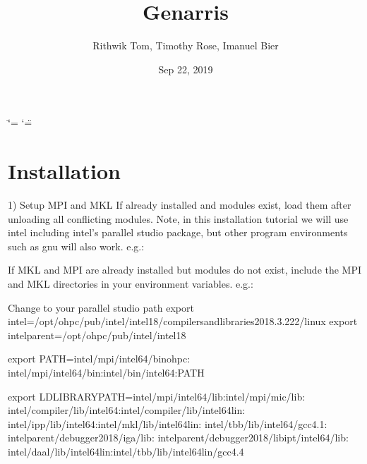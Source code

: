 \documentclass[letterpaper,10pt,english]{sphinxmanual}
\title{Genarris}
\date{Sep 22, 2019}
\author{Rithwik Tom, Timothy Rose, Imanuel Bier}
\begin{document}
\ifdefined\shorthandoff
  \ifnum\catcode`\=\string=\active\shorthandoff{=}\fi
  \ifnum\catcode`\"=\active{}\fi
\fi

\pagestyle{empty}
\sphinxmaketitle
\pagestyle{plain}
\sphinxtableofcontents
\pagestyle{normal}
\label{\detokenize{index::doc}}



\chapter{Installation}
\label{\detokenize{index:installation}}
1) Setup MPI and MKL
If already installed and modules exist, load them after unloading all conflicting modules. Note, in this installation tutorial we will use intel including intel's parallel studio package, but other program environments such as gnu will also work.
e.g.:

\begin{sphinxVerbatim}[commandchars=\\\{\}]
  
  
  
  
\end{sphinxVerbatim}

If MKL and MPI are already installed but modules do not exist, include the MPI and MKL directories in your environment variables.
e.g.:

\begin{sphinxVerbatim}[commandchars=\\\{\}]
\PYGZsh{}Change to your parallel studio path
export \PYGZdl{}intel=/opt/ohpc/pub/intel/intel18/compilers\PYGZus{}and\PYGZus{}libraries\PYGZus{}2018.3.222/linux
export \PYGZdl{}intel\PYGZus{}parent=/opt/ohpc/pub/intel/intel18

export PATH=\PYGZdq{}\PYGZdl{}intel/mpi/intel64/bin\PYGZus{}ohpc:\PYGZbs{}
\PYGZdl{}intel/mpi/intel64/bin:\PYGZdl{}intel/bin/intel64:\PYGZdl{}PATH\PYGZdq{}

export LD\PYGZus{}LIBRARY\PYGZus{}PATH=\PYGZdq{}\PYGZdl{}intel/mpi/intel64/lib:\PYGZdl{}intel/mpi/mic/lib:\PYGZbs{}
\PYGZdl{}intel/compiler/lib/intel64:\PYGZdl{}intel/compiler/lib/intel64\PYGZus{}lin:\PYGZbs{}
\PYGZdl{}intel/ipp/lib/intel64:\PYGZdl{}intel/mkl/lib/intel64\PYGZus{}lin:\PYGZbs{}
\PYGZdl{}intel/tbb/lib/intel64/gcc4.1:\PYGZbs{}
\PYGZdl{}intel\PYGZus{}parent/debugger\PYGZus{}2018/iga/lib:\PYGZbs{}
\PYGZdl{}intel\PYGZus{}parent/debugger\PYGZus{}2018/libipt/intel64/lib:\PYGZbs{}
\PYGZdl{}intel/daal/lib/intel64\PYGZus{}lin:\PYGZdl{}intel/tbb/lib/intel64\PYGZus{}lin/gcc4.4\PYGZdq{}
\end{sphinxVerbatim}
\end{document}
